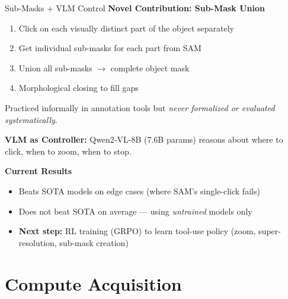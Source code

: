 \documentclass[10pt, aspectratio=169]{beamer}
\begin{document}
\begin{frame}{Sub-Masks + VLM Control}
  \textbf{Novel Contribution: Sub-Mask Union}
  \begin{enumerate}
    \item Click on each visually distinct part of the object separately
    \item Get individual sub-masks for each part from SAM
    \item Union all sub-masks $\rightarrow$ complete object mask
    \item Morphological closing to fill gaps
  \end{enumerate}

  \vspace{0.2em}
  Practiced informally in annotation tools but \textit{never formalized or evaluated systematically}.

  \vspace{0.3em}
  \textbf{VLM as Controller:} Qwen2-VL-8B (7.6B params) reasons about where to click, when to zoom, when to stop.

  \vspace{0.2em}
  \textbf{Current Results}
  \begin{itemize}
    \item Beats SOTA models on edge cases (where SAM's single-click fails)
    \item Does not beat SOTA on average --- using \textit{untrained} models only
    \item \textbf{Next step:} RL training (GRPO) to learn tool-use policy (zoom, super-resolution, sub-mask creation)
  \end{itemize}
\end{frame}

\section{Compute Acquisition}
\end{document}

